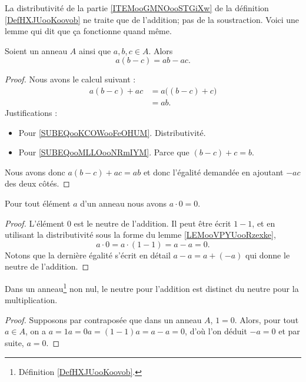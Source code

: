La distributivité de la partie \ref{ITEMooGMNOooSTGiXw} de la définition \ref{DefHXJUooKoovob} ne traite que de l'addition; pas de la soustraction. Voici une lemme qui dit que ça fonctionne quand même.
\begin{lemma}     \label{LEMooVPYUooRzexke}
	Soient un anneau \( A\) ainsi que \( a,b,c\in A\). Alors
	\begin{equation}
		a(b-c)=ab-ac.
	\end{equation}
\end{lemma}

\begin{proof}
	Nous avons le calcul suivant :
	\begin{subequations}
		\begin{align}
			a(b-c)+ac & =a\big( (b-c)+c \big)     \label{SUBEQooKCOWooFeOHUM} \\
			          & =ab.       \label{SUBEQooMLLOooNRmIYM}
		\end{align}
	\end{subequations}
	Justifications :
	\begin{itemize}
		\item Pour \ref{SUBEQooKCOWooFeOHUM}. Distributivité.
		\item Pour \ref{SUBEQooMLLOooNRmIYM}. Parce que \( (b-c)+c=b\).
	\end{itemize}
	Nous avons donc \( a(b-c)+ac=ab\) et donc l'égalité demandée en ajoutant \( -ac\) des deux côtés.
\end{proof}

\begin{lemma}       \label{LEMooVUSMooWisQpD}
	Pour tout élément \( a\) d'un anneau nous avons \( a\cdot 0=0\).
\end{lemma}

\begin{proof}
	L'élément \( 0\) est le neutre de l'addition. Il peut être écrit \( 1-1\), et en utilisant la distributivité sous la forme du lemme \ref{LEMooVPYUooRzexke},
	\begin{equation}
		a\cdot 0=a\cdot (1-1)=a-a=0.
	\end{equation}
	Notons que la dernière égalité s'écrit en détail \( a-a=a+(-a)\) qui donne le neutre de l'addition.
\end{proof}

\begin{proposition}     \label{PROPooNCCGooXjVyVt}
	Dans un anneau\footnote{Définition \ref{DefHXJUooKoovob}.} non nul, le neutre pour l'addition est distinct du neutre pour la multiplication.
\end{proposition}
\begin{proof}
	Supposons par contraposée que dans un anneau \( A\), \( 1 = 0 \). Alors, pour tout \( a \in A \), on a \( a = 1a = 0a = (1 - 1)a = a - a=0 \), d'où l'on déduit \( -a = 0  \) et par suite, \( a = 0. \)
\end{proof}

